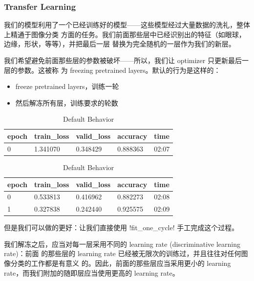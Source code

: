 \documentclass{ctexart}
\begin{document}
\subsubsection{Transfer Learning}

我们的模型利用了一个已经训练好的模型——这些模型经过大量数据的洗礼，整体上精通于图像分类
方面的任务。我们前面那些层中已经识别出的特征（如眼球，边缘，形状，等等），并把最后一层
替换为完全随机的一层作为我们的新层。

我们希望避免前面那些层的参数被破坏——所以，我们让 optimizer 只更新最后一层的参数。这被称
为 freezing pretrained layers。默认的行为是这样的：

\begin{itemize}
    \item freeze pretrained layers，训练一轮
    \item 然后解冻所有层，训练要求的轮数
\end{itemize}

\begin{table}[H]
    \begin{longtable}[]{@{}lllll@{}}
        \toprule()
        epoch & train\_loss & valid\_loss & accuracy & time  \\
        \midrule()
        \endhead
        0     & 1.341070    & 0.348429    & 0.888363 & 02:07 \\
        \bottomrule()
    \end{longtable}

    \begin{longtable}[]{@{}lllll@{}}
        \toprule()
        epoch & train\_loss & valid\_loss & accuracy & time  \\
        \midrule()
        \endhead
        0     & 0.533813    & 0.416962    & 0.882273 & 02:08 \\
        1     & 0.327838    & 0.242440    & 0.925575 & 02:09 \\
        \bottomrule()
    \end{longtable}
    \caption{Default Behavior}
    \label{fig:default_learner}
\end{table}

但是我们可以做的更好：让我们直接使用 \mono!fit_one_cycle! 手工完成这个过程。

我们解冻之后，应当对每一层采用不同的 learning rate (discriminative learning rate)：前面
的那些层的 learning rate 已经被无限次的训练过，并且往往对任何图像分类的工作都是有意义
的。因此，前面的那些层应当采用更小的 learning rate，而我们附加的随即层应当使用更高的
learning rate。
\end{document}
